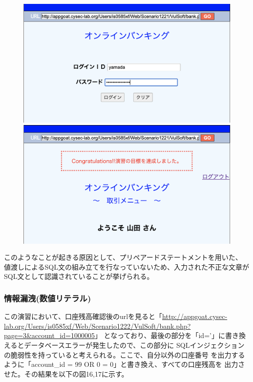 \documentclass[dvipdfmx,autodetect-engine,titlepage]{jsarticle}
\begin{document}
\begin{figure}[h]
  \centering
  \begin{minipage}[b]{0.45\linewidth}
  \begin{center}
    \includegraphics[keepaspectratio,scale=0.35]{pic14.png}
    \end{center}
    \caption{}
  \end{minipage}
  \begin{minipage}[b]{0.45\linewidth}
  \begin{center}
    \includegraphics[keepaspectratio,scale=0.35]{pic15.png}
    \end{center}
    \caption{}
  \end{minipage}
\end{figure}

このようなことが起きる原因として、プリペアードステートメントを用いた、
値渡しによるSQL文の組み立てを行なっていないため、入力された不正な文章が
SQL文として認識されていることが挙げられる。

\subsubsection*{情報漏洩(数値リテラル)}
この演習において、口座残高確認後のurlを見ると「\url{http://appgoat.cysec-lab.org/Users/is0585xf/Web/Scenario1222/VulSoft/bank.php?page=3&account_id=1000005}」
となっており、最後の部分を「id='」に書き換えるとデータベースエラーが発生したので、この部分に
SQLインジェクションの脆弱性を持っていると考えられる。ここで、自分以外の口座番号
を出力するように「account\_id = 99 OR 0 = 0」と書き換え、すべての口座残高を
出力させた。その結果を以下の図16,17に示す。
\end{document}
